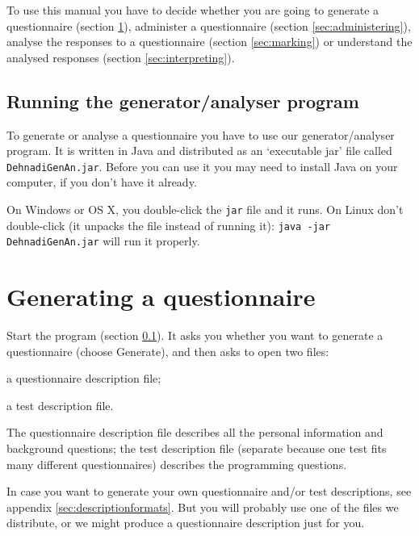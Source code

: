 \documentclass[11pt,a4paper]{article}
\newcommand{\rbparagraph}{}
\newcommand{\seclabel}[1]{\label{sec:#1}}
\newcommand{\secref}[1]{section \ref{sec:#1}}
\newcommand{\appxref}[1]{appendix \ref{sec:#1}}
\begin{document}
To use this manual you have to decide whether you are going to generate a questionnaire (\secref{generating}), administer a questionnaire (\secref{administering}), analyse the responses to a questionnaire (\secref{marking}) or understand the analysed responses (\secref{interpreting}). 

\subsection{Running the generator/analyser program}
\seclabel{running}
\rbparagraph{}
To generate or analyse a questionnaire you have to use our generator/analyser program. It is written in Java and distributed as an `executable jar' file called \texttt{DehnadiGenAn.jar}. Before you can use it you may need to install Java on your computer, if you don't have it already.

On Windows or OS X, you double-click the \texttt{jar} file and it runs. On Linux don't double-click (it unpacks the file instead of running it): \texttt{java -jar DehnadiGenAn.jar} will run it properly.

\section{Generating a questionnaire}
\seclabel{generating}

Start the program (\secref{running}). It asks you whether you want to generate a questionnaire (choose Generate), and then asks to open two files:
\begin{itemize*}
\item a questionnaire description file;
\item a test description file.
\end{itemize*}
The questionnaire description file describes all the personal information and background questions; the test description file (separate because one test fits many different questionnaires) describes the programming questions.

In case you want to generate your own questionnaire and/or test descriptions, see \appxref{descriptionformats}. But you will probably use one of the files we distribute, or we might produce a questionnaire description just for you. 
\end{document}
